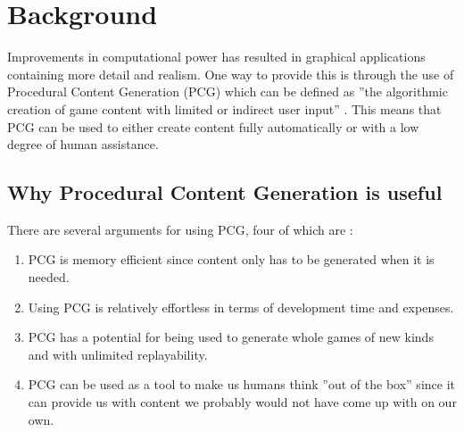 \section{Background}
\begin{comment}
\textcolor{red}{
Bakgrund ska innehålla en motivering till varför det valda ämnet är intressant ur akademisk synvinkel och/eller ur tekniskt perspektiv eller i förekommande fall ur kundens/uppdragsgivarens perspektiv. I vissa fall ska den här rubriken inkludera en kort historik över ämnet. Efter att ha läst bakgrunden ska alla läsare förstå varför ämnet är relevant. Följande frågeställningar bör vara aktuella:
\begin{itemize}
    \item Vad är ämnet/problemet som ska undersökas?
    \item Varför har ämnet/problemet uppkommit?
    \item Varför och för vem är det ett relevant eller intressant ämne/problem?
    \item Kan det specifika ämnet/problemet relateras till en mer generell diskussion?
\end{itemize}
}
\end{comment}

Improvements in computational power has resulted in graphical applications containing more detail and realism. One way to provide this is through the use of Procedural Content Generation (PCG) which can be defined as ''the algorithmic creation of game content with limited or indirect user input'' \cite[p. 1]{shaker2016procedural}. This means that PCG can be used to either create content fully automatically or with a low degree of human assistance.

\subsection{Why Procedural Content Generation is useful}

There are several arguments for using PCG, four of which are \cite[pp. 141-142]{search-based_pcg}:
\begin{enumerate}
    \item PCG is memory efficient since content only has to be generated when it is needed.
    \item Using PCG is relatively effortless in terms of development time and expenses.
    \item PCG has a potential for being used to generate whole games of new kinds and with unlimited replayability.
    \item PCG can be used as a tool to make us humans think ''out of the box'' since it can provide us with content we probably would not have come up with on our own.
\end{enumerate}

